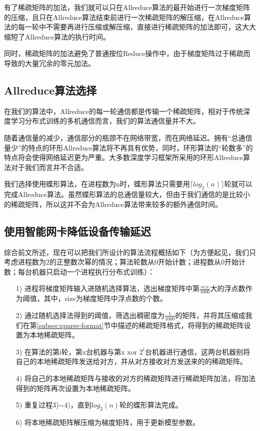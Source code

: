 有了稀疏矩阵的加法，我们就可以只在Allreduce算法的最开始进行一次梯度矩阵的压缩，且只在Allreduce算法结束前进行一次稀疏矩阵的解压缩，在Allreduce算法的每一轮中不需要再进行压缩或解压缩，直接进行稀疏矩阵的加法即可，这大大缩短了Allreduce算法的执行时间。

同时，稀疏矩阵的加法避免了普通按位Reduce操作中，由于梯度矩阵过于稀疏而导致的大量冗余的零元加法。

\subsection{Allreduce算法选择}
在我们的算法中，Allreduce的每一轮通信都是传输一个稀疏矩阵，相对于传统深度学习分布式训练的多机通信而言，我们的算法通信量并不大。

随着通信量的减少，通信部分的瓶颈不在网络带宽，而在网络延迟。拥有“总通信量少”的特点的环形Allreduce算法将不再具有优势，同时，环形算法的“轮数多”的特点将会使得网络延迟更为严重。大多数深度学习框架所采用的环形Allreduce算法对于我们而言并不合适。

我们选择使用蝶形算法，在进程数为n时，蝶形算法只需要用$\lceil log_2(n) \rceil$轮就可以完成Allreduce算法。虽然蝶形算法的总通信量较大，但由于我们通信的是比较小的稀疏矩阵，所以这并不会为Allreduce算法带来较多的额外通信时间。

\subsection{使用智能网卡降低设备传输延迟}
综合前文所述，现在可以把我们所设计的算法流程概括如下（为方便起见，我们只考虑进程数为2的正整数次幂的情况；算法轮数从0开始计数；进程数从0开始计数；每台机器只启动一个进程执行分布式训练）：
\begin{itemize}
  \item [1)]
  进程将梯度矩阵输入进随机选择算法，选出梯度矩阵中第$\frac{size}{1000}$大的浮点数作为阈值，其中，size为梯度矩阵中浮点数的个数。
  \item [2)] 
  通过随机选择法得到的阈值，筛选出稠密度为$\frac{1}{1000}$的矩阵，并将其压缩成我们在第\ref{subsec:sparse-format}节中描述的稀疏矩阵格式，将得到的稀疏矩阵设置为本地稀疏矩阵。
  \item [3)]
  在算法的第i轮，第x台机器与第x xor $2^i$台机器进行通信，这两台机器别将自己的本地稀疏矩阵发送给对方，并从对方接收对方发送来的的稀疏矩阵。
  \item [4)]
  将自己的本地稀疏矩阵与接收的对方的稀疏矩阵进行稀疏矩阵加法，将加法得到的矩阵再次设置为本地稀疏矩阵。
  \item [5)]
  重复过程3)$\sim$4)，直到$log_2(n)$轮的蝶形算法完成。
  \item [6)]
  将本地稀疏矩阵解压缩为梯度矩阵，用于更新模型参数。
\end{itemize}

